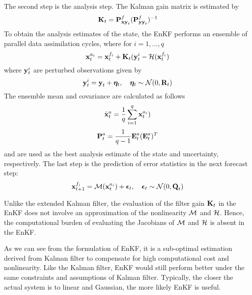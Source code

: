 The second step is the analysis step. The Kalman gain matrix is estimated by
\begin{equation}\label{eq:kalmangain}
\textbf{K}_t=\textbf{P}_{\textbf{x}\textbf{y}_t}^f(\textbf{P}_{\textbf{y}\textbf{y}_t}^f)^{-1}
\end{equation}
To obtain the analysis estimates of the state, the EnKF performs an ensemble of parallel data assimilation cycles, where for $i=1,...,q$
\begin{equation}\label{eq:ensembleupdate}
\textbf{x}_t^{a_i} = \textbf{x}_t^{f_i} + \textbf{K}_t(\textbf{y}_t^i - \mathcal{H}(\textbf{x}_t^{f_i})
\end{equation}
where $\textbf{y}_t^i$ are perturbed observations given by
\begin{equation}\label{eq:perturbobservation}
\textbf{y}_t^i = \textbf{y}_t + \bm{\eta}_t,\quad \bm{\eta}_t\sim\mathcal{N}(0,\textbf{R}_t)
\end{equation}
The ensemble mean and covariance are calculated as follows
\begin{equation}
\bar{\textbf{x}}_t^a=\frac{1}{q}\sum_{i=1}^q \textbf{x}_t^{a_i}) 
\end{equation}\label{eq:xa}
\begin{equation}
\textbf{P}_t^a = \frac{1}{q-1}\textbf{E}_t^a(\textbf{E}_t^a)^T
\end{equation}\label{eq:Pa}
and are used as the best analysis estimate of the state and uncertainty, respectively. The last step is the prediction of error statistics in the next forecast step:
\begin{equation}
\textbf{x}_{t+1}^{f_i}=\mathcal{M}(\textbf{x}_t^{a_i}) + \bm{\epsilon}_t,\quad \bm{\epsilon}_t\sim\mathcal{N}(0,\textbf{Q}_t)
\end{equation}
\par Unlike the extended Kalman filter, the evaluation of the filter gain $\textbf{K}_t$ in the EnKF does not involve an approximation of the nonlinearity $\mathcal{M}$ and $\mathcal{H}$. Hence, the computational burden of evaluating the Jacobians of $\mathcal{M}$ and $\mathcal{H}$ is absent in the EnKF. 
\par As we can see from the formulation of EnKF, it is a sub-optimal estimation derived from Kalman filter to compensate for high computational cost and nonlinearity. Like the Kalman filter, EnKF would still perform better under the same constraints and assumptions of Kalman filter. Typically, the closer the actual system is to linear and Gaussian, the more likely EnKF is useful. 

